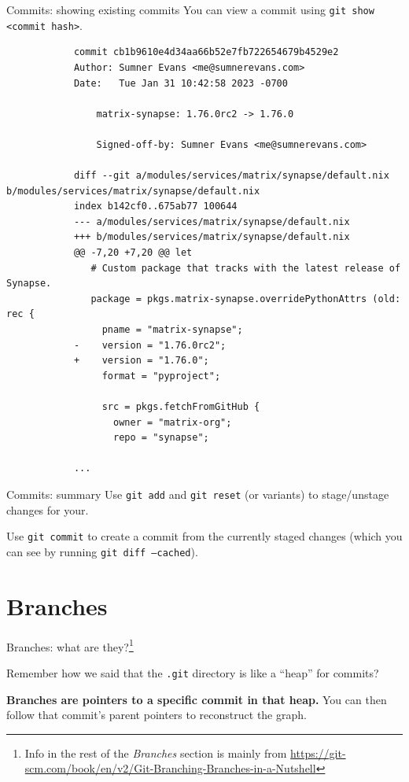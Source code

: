 \documentclass{beeper}
\begin{document}
\begin{frame}[fragile]{Commits: showing existing commits}
    You can view a commit using \texttt{git show <commit hash>}.

    {
        \tiny
        \begin{verbatim}
            commit cb1b9610e4d34aa66b52e7fb722654679b4529e2
            Author: Sumner Evans <me@sumnerevans.com>
            Date:   Tue Jan 31 10:42:58 2023 -0700

                matrix-synapse: 1.76.0rc2 -> 1.76.0

                Signed-off-by: Sumner Evans <me@sumnerevans.com>

            diff --git a/modules/services/matrix/synapse/default.nix b/modules/services/matrix/synapse/default.nix
            index b142cf0..675ab77 100644
            --- a/modules/services/matrix/synapse/default.nix
            +++ b/modules/services/matrix/synapse/default.nix
            @@ -7,20 +7,20 @@ let
               # Custom package that tracks with the latest release of Synapse.
               package = pkgs.matrix-synapse.overridePythonAttrs (old: rec {
                 pname = "matrix-synapse";
            -    version = "1.76.0rc2";
            +    version = "1.76.0";
                 format = "pyproject";

                 src = pkgs.fetchFromGitHub {
                   owner = "matrix-org";
                   repo = "synapse";

            ...
        \end{verbatim}
    }
\end{frame}

\begin{frame}{Commits: summary}
    Use \texttt{git add} and \texttt{git reset} (or variants) to stage/unstage
    changes for your.
    \pause

    Use \texttt{git commit} to create a commit from the currently staged changes
    (which you can see by running \texttt{git diff --cached}).
\end{frame}

\section{Branches}

\begin{frame}{Branches: what are they?\footnote[frame]{Info in the rest of the
    \textit{Branches} section is mainly from
    \url{https://git-scm.com/book/en/v2/Git-Branching-Branches-in-a-Nutshell}}}

    Remember how we said that the \texttt{.git} directory is like a ``heap'' for
    commits?

    \textbf{Branches are pointers to a specific commit in that heap.} You can
    then follow that commit's parent pointers to reconstruct the graph.
\end{frame}
\end{document}
